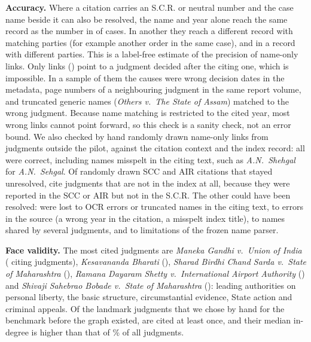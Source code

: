 \textbf{Accuracy.} Where a citation carries an S.C.R. or neutral number and the case name beside it can also be resolved, the name and year alone reach the same record as the number in \GraphNameSamePct{} of \GraphNamePrecN{} cases. In another \GraphNameLoosePct{} they reach a different record with matching parties (for example another order in the same case), and in \GraphNameWrongPct{} a record with different parties. This is a label-free estimate of the precision of name-only links. Only \GraphLater{} links (\GraphLaterPct) point to a judgment decided after the citing one, which is impossible. In a sample of them the causes were wrong decision dates in the metadata, page numbers of a neighbouring judgment in the same report volume, and truncated generic names (\emph{Others v.\ The State of Assam}) matched to the wrong judgment. Because name matching is restricted to the cited year, most wrong links cannot point forward, so this check is a sanity check, not an error bound. We also checked by hand \GraphCheckN{} randomly drawn name-only links from judgments outside the pilot, against the citation context and the index record: all \GraphCheckOK{} were correct, including names misspelt in the citing text, such as \emph{A.N.\ Shehgal} for \emph{A.N.\ Sehgal}. Of \UnresN{} randomly drawn SCC and AIR citations that stayed unresolved, \UnresNotIndex{} cite judgments that are not in the index at all, because they were reported in the SCC or AIR but not in the S.C.R. The other \UnresInIndex{} could have been resolved: \UnresExtraction{} were lost to OCR errors or truncated names in the citing text, \UnresSource{} to errors in the source (a wrong year in the citation, a misspelt index title), \UnresAmbig{} to names shared by several judgments, and \UnresVerifier{} to limitations of the frozen name parser.

\textbf{Face validity.} The most cited judgments are \emph{Maneka Gandhi v.\ Union of India} (\GraphTopOneN{} citing judgments), \emph{Kesavananda Bharati} (\GraphTopTwoN), \emph{Sharad Birdhi Chand Sarda v.\ State of Maharashtra} (\GraphTopThreeN), \emph{Ramana Dayaram Shetty v.\ International Airport Authority} (\GraphTopFourN) and \emph{Shivaji Sahebrao Bobade v.\ State of Maharashtra} (\GraphTopFiveN): leading authorities on personal liberty, the basic structure, circumstantial evidence, State action and criminal appeals. Of the \GraphLandmarkN{} landmark judgments that we chose by hand for the benchmark before the graph existed, \GraphLandmarkCited{} are cited at least once, and their median in-degree is higher than that of \GraphLandmarkPct\% of all judgments.
